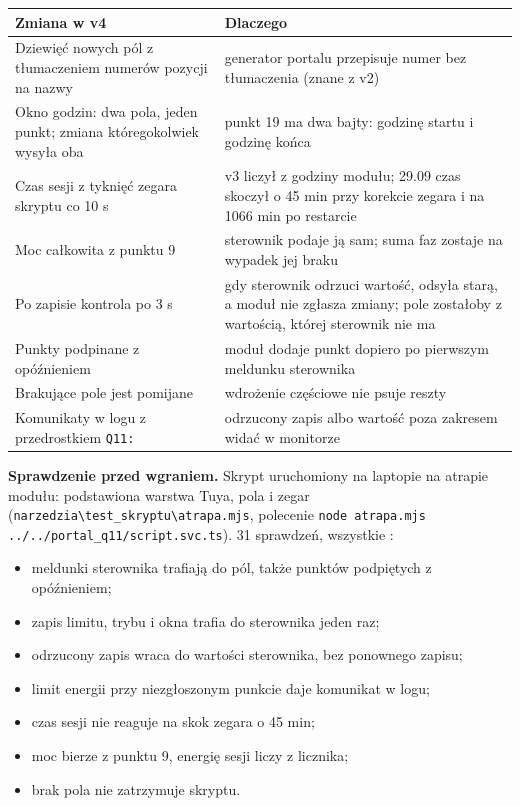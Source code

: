 \documentclass[11pt,a4paper]{article}
\begin{document}
\begin{longtable}{>{\raggedright\arraybackslash}p{5.95cm}>{\raggedright\arraybackslash}p{9.77cm}}
\toprule
\rowcolor{apteallight}\textbf{Zmiana w v4} & \textbf{Dlaczego} \\
\midrule\endhead
\bottomrule\endfoot
Dziewięć nowych pól z tłumaczeniem numerów pozycji na nazwy & generator portalu przepisuje numer bez tłumaczenia (znane z v2) \\
Okno godzin: dwa pola, jeden punkt; zmiana któregokolwiek wysyła oba & punkt 19 ma dwa bajty: godzinę startu i godzinę końca \\
Czas sesji z tyknięć zegara skryptu co 10 s & v3 liczył z godziny modułu; 29.09 czas skoczył o 45 min przy korekcie zegara i na 1066 min po restarcie \\
Moc całkowita z punktu 9 & sterownik podaje ją sam; suma faz zostaje na wypadek jej braku \\
Po zapisie kontrola po 3 s & gdy sterownik odrzuci wartość, odsyła starą, a moduł nie zgłasza zmiany; pole zostałoby z wartością, której sterownik nie ma \\
Punkty podpinane z opóźnieniem & moduł dodaje punkt dopiero po pierwszym meldunku sterownika \\
Brakujące pole jest pomijane & wdrożenie częściowe nie psuje reszty \\
Komunikaty w logu z przedrostkiem \texttt{Q11:} & odrzucony zapis albo wartość poza zakresem widać w monitorze \\
\end{longtable}

\textbf{Sprawdzenie przed wgraniem.} Skrypt uruchomiony na laptopie na atrapie modułu: podstawiona warstwa Tuya, pola i zegar (\texttt{narzedzia\textbackslash{}test\_\allowbreak{}skryptu\textbackslash{}atrapa.\allowbreak{}mjs}, polecenie \texttt{node atrapa.\allowbreak{}mjs .\allowbreak{}.\allowbreak{}/\allowbreak{}.\allowbreak{}.\allowbreak{}/\allowbreak{}portal\_\allowbreak{}q11/\allowbreak{}script.\allowbreak{}svc.\allowbreak{}ts}). 31 sprawdzeń, wszystkie :

\begin{itemize}
\item meldunki sterownika trafiają do pól, także punktów podpiętych z opóźnieniem;
\item zapis limitu, trybu i okna trafia do sterownika jeden raz;
\item odrzucony zapis wraca do wartości sterownika, bez ponownego zapisu;
\item limit energii przy niezgłoszonym punkcie daje komunikat w logu;
\item czas sesji nie reaguje na skok zegara o 45 min;
\item moc bierze z punktu 9, energię sesji liczy z licznika;
\item brak pola nie zatrzymuje skryptu.
\end{itemize}
\end{document}

